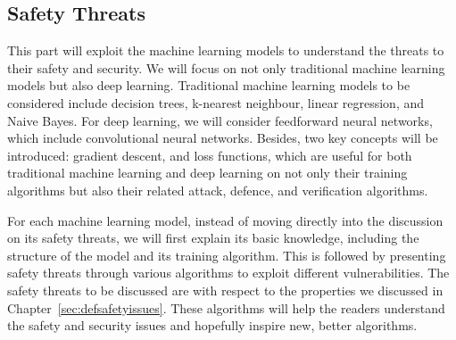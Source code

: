 % 
%
%

\begin{partbacktext}
\part{Safety Threats}\label{chap:simple}\label{part:simple}

This part will exploit the machine learning models to understand the threats to their safety and security. We will focus on not only traditional machine learning models but also deep learning. Traditional machine learning models to be considered include decision trees, k-nearest neighbour, linear regression, and Naive Bayes. For deep learning, we will consider feedforward neural networks, which include convolutional neural networks.  Besides, two key concepts will be introduced: gradient descent, and loss functions, which are useful for both traditional machine learning and deep learning on not only their training algorithms but also their related  attack, defence, and verification algorithms. 



For each machine learning model, instead of moving directly into the discussion on its safety threats, we will first explain its basic knowledge, including the structure of the model and its training algorithm. This is followed by presenting safety threats through various algorithms to exploit different vulnerabilities. The safety threats to be discussed are  with respect to the properties we discussed in Chapter~\ref{sec:defsafetyissues}. 
These algorithms will help the readers understand the safety and security issues and hopefully inspire new, better algorithms. 


\end{partbacktext}
